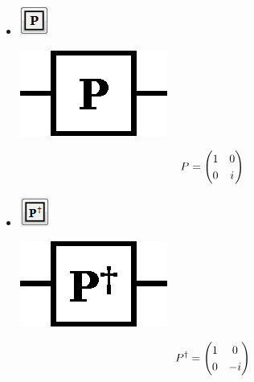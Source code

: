 \documentclass[10pt]{article}
\theoremstyle{definition}
\begin{document}
\begin{itemize}
\item \includegraphics{Figures/Gates/PGate.png} 

\begin{center}
\includegraphics[scale=.7]{Figures/Gates/PGateViewer} \\
\vspace*{3pt}
\begin{minipage}{.9\linewidth}
    \begin{equation*} \label{mat:PGate}
    \renewcommand{\arraystretch}{1.25}
P = \begin{pmatrix} 1 & 0 \\ 0 & i \end{pmatrix}
    \end{equation*}
  \end{minipage}\hspace{-2.5cm}
\end{center}

\item \includegraphics{Figures/Gates/PAdjointGate.png} 
\begin{center}
\includegraphics[scale=.7]{Figures/Gates/PAdjointGateViewer} \\
\vspace*{3pt}
\begin{minipage}{.9\linewidth}
    \begin{equation*} \label{mat:PGateAdjoint}
    \renewcommand{\arraystretch}{1.25}
P^\dagger = \begin{pmatrix} 1 & 0 \\ 0 & -i \end{pmatrix}
    \end{equation*}
  \end{minipage}\hspace{-2.5cm}
\end{center}


\end{itemize}
\end{document}
